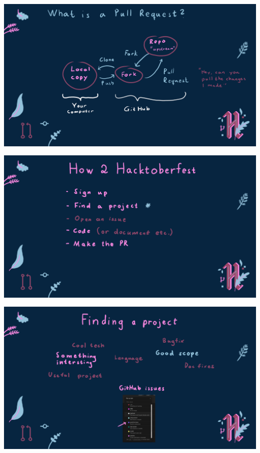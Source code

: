 \documentclass[aspectratio=169]{beamer}
\begin{document}
\begin{frame}[plain]
    \includegraphics[width=\textwidth]{slide4.png}
\end{frame}
\begin{frame}[plain]
    \includegraphics[width=\textwidth]{slide5.png}
\end{frame}
\begin{frame}[plain]
    \includegraphics[width=\textwidth]{slide6.png}
\end{frame}
\end{document}
